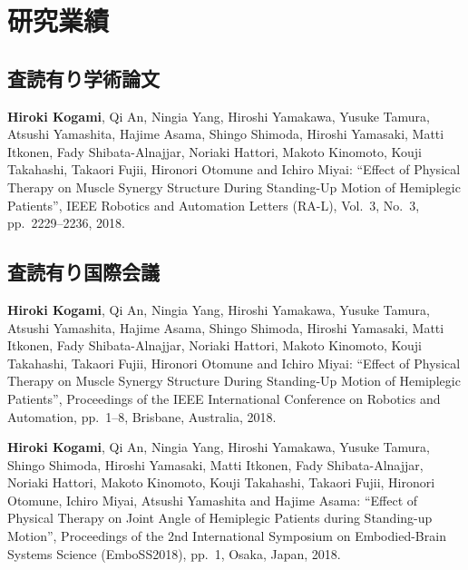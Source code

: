 \chapter*{研究業績}
\thispagestyle{empty}
\lhead[研究業績]{}
\label{achive}

\newpage
\section*{査読有り学術論文}

\mbox{}
\begin{enumerate}[{[}1{]}]
\item \textbf{Hiroki Kogami}, Qi An, Ningia Yang, Hiroshi Yamakawa, Yusuke Tamura, Atsushi Yamashita, Hajime Asama, Shingo Shimoda, Hiroshi Yamasaki, Matti Itkonen, Fady Shibata-Alnajjar, Noriaki Hattori, Makoto Kinomoto, Kouji Takahashi, Takaori Fujii, Hironori Otomune and Ichiro Miyai: ``Effect of Physical Therapy on Muscle Synergy Structure During Standing-Up Motion of Hemiplegic Patients'', IEEE Robotics and Automation Letters (RA-L), Vol.~3, No.~3, pp.~2229--2236, 2018.
\end{enumerate}

\section*{査読有り国際会議}

\mbox{}
\begin{enumerate}[{[}1{]}]
\item \textbf{Hiroki Kogami}, Qi An, Ningia Yang, Hiroshi Yamakawa, Yusuke Tamura, Atsushi Yamashita, Hajime Asama, Shingo Shimoda, Hiroshi Yamasaki, Matti Itkonen, Fady Shibata-Alnajjar, Noriaki Hattori, Makoto Kinomoto, Kouji Takahashi, Takaori Fujii, Hironori Otomune and Ichiro Miyai: ``Effect of Physical Therapy on Muscle Synergy Structure During Standing-Up Motion of Hemiplegic Patients'', Proceedings of the IEEE International Conference on Robotics and Automation, pp.~1--8, Brisbane, Australia, 2018. 

\item \textbf{Hiroki Kogami}, Qi An, Ningia Yang, Hiroshi Yamakawa, Yusuke Tamura, Shingo Shimoda, Hiroshi Yamasaki, Matti Itkonen, Fady Shibata-Alnajjar, Noriaki Hattori, Makoto Kinomoto, Kouji Takahashi, Takaori Fujii, Hironori Otomune, Ichiro Miyai, Atsushi Yamashita and Hajime Asama: ``Effect of Physical Therapy on Joint Angle of Hemiplegic Patients during Standing-up Motion'', Proceedings of the 2nd International Symposium on Embodied-Brain Systems Science (EmboSS2018), pp.~1, Osaka, Japan, 2018. 
\end{enumerate}

